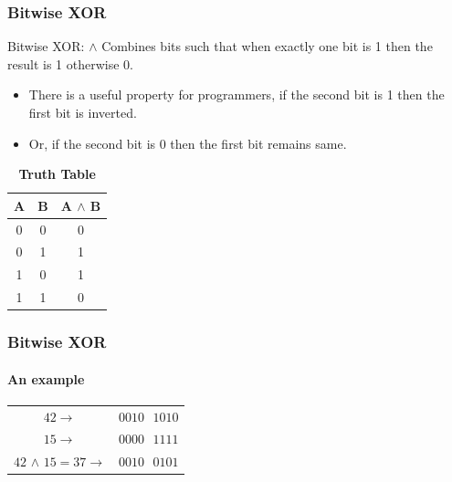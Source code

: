 \documentclass[table, compress]{beamer}
\begin{document}
\begin{frame}
    \frametitle{Bitwise XOR}
    
    \begin{block}{Bitwise XOR: $\wedge$}
    	Combines bits such that when exactly one bit is 1 then the result is 1 otherwise 0.
    \end{block}
    
    \begin{itemize}
    	\item There is a useful property for programmers, if the second bit is 1 then the first bit is inverted.
    	\item Or, if the second bit is 0 then the first bit remains same.
    \end{itemize}
    
    \begin{table}
    \centering
    \begin{tabular}{| c  c c |}
    	\hline
    	A & B & A $\wedge$ B\\ \hline\hline
    	0 & 0 & 0 \\ \hline
    	0 & 1 & 1 \\ \hline
    	1 & 0 & 1 \\ \hline
    	1 & 1 & 0 \\ \hline
    \end{tabular}
    \caption*{\textbf{Truth Table}}
    \end{table}

\end{frame}


\begin{frame}
    \frametitle{Bitwise XOR}
    \framesubtitle{An example}
    
    \begin{table}
    \centering
    \begin{tabular}{c  c}
    	$42\rightarrow$ & $0010\textrm{ }1010$\\
    	$15\rightarrow$ & $0000\textrm{ }1111$\\ \hline
    	$42$ $\wedge$ $15 = 37\rightarrow$ & $0010\textrm{ }0101$\\
    \end{tabular}
    \end{table}
\end{frame}
\end{document}
